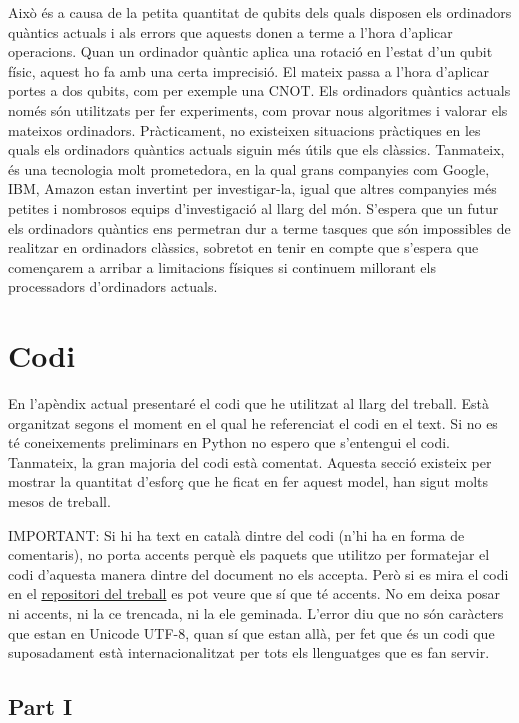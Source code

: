 Això és a causa de la petita quantitat de qubits dels quals disposen els ordinadors quàntics actuals i als errors que aquests donen a terme a l'hora d'aplicar operacions. Quan un ordinador quàntic aplica una rotació en l'estat d'un qubit físic, aquest ho fa amb una certa imprecisió. El mateix passa a l'hora d'aplicar portes a dos qubits, com per exemple una $\mathrm{CNOT}$. Els ordinadors quàntics actuals només són utilitzats per fer experiments, com provar nous algoritmes i valorar els mateixos ordinadors. Pràcticament, no existeixen situacions pràctiques en les quals els ordinadors quàntics actuals siguin més útils que els clàssics. Tanmateix, és una tecnologia molt prometedora, en la qual grans companyies com Google, IBM, Amazon estan invertint per investigar-la, igual que altres companyies més petites i nombrosos equips d'investigació al llarg del món. S'espera que un futur els ordinadors quàntics ens permetran dur a terme tasques que són impossibles de realitzar en ordinadors clàssics, sobretot en tenir en compte que s'espera que començarem a arribar a limitacions físiques si continuem millorant els processadors d'ordinadors actuals.


\chapter{Codi}
En l'apèndix actual presentaré el codi que he utilitzat al llarg del treball. Està organitzat segons el moment en el qual he referenciat el codi en el text. Si no es té coneixements preliminars en Python no espero que s'entengui el codi. Tanmateix, la gran majoria del codi està comentat. Aquesta secció existeix per mostrar la quantitat d'esforç que he ficat en fer aquest model, han sigut molts mesos de treball.

IMPORTANT: Si hi ha text en català dintre del codi (n'hi ha en forma de comentaris), no porta accents perquè els paquets que utilitzo per formatejar el codi d'aquesta manera dintre del document no els accepta. Però si es mira el codi en el \href{https://github.com/tomiock/qGAN}{repositori del treball} es pot veure que sí que té accents. No em deixa posar ni accents, ni la ce trencada, ni la ele geminada. L'error diu que no són caràcters que estan en Unicode UTF-8, quan sí que estan allà, per fet que és un codi que suposadament està internacionalitzat per tots els llenguatges que es fan servir.

\section{Part I}
